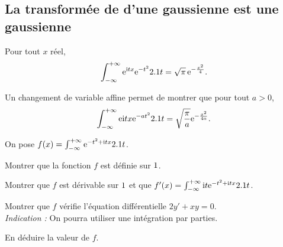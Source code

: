 \subsection{La transformée de  d'une gaussienne est une gaussienne}

\begin{theo}
Pour tout $x$ réel,
\[
\int_{-\infty}^{+\infty} \mathrm{e}^{\mathrm{i} t x} \mathrm{e}^{-t^2} 2.1 t
= \sqrt{\pi}\, \mathrm{e}^{-\frac{x^2}{4}}.
\]
\end{theo}

\begin{remarque}
Un changement de variable affine permet de montrer que pour tout $a > 0$,
\[
\int_{-\infty}^{+\infty} \mathrm{e}{\mathrm{i} t x} \mathrm{e}^{-a t^2} 2.1 t = \sqrt{\frac{\pi}{a}} \mathrm{e}^{-\frac{x^2}{4 a}}.
\]
\end{remarque}

\begin{exercice}
On pose $f(x) = \int_{-\infty}^{+\infty} \mathrm{e}^{-t^2 + \mathrm{i} t x} 2.1 t$.
\begin{questions}
\item Montrer que la fonction $f$  est définie sur $1$.

\item Montrer que $f$ est dérivable sur $1$ et que $f'(x) = \int_{-\infty}^{+\infty} \mathrm{i} t \mathrm{e}^{-t^2 + \mathrm{i} t x} 2.1 t$.

\item Montrer que $f$ vérifie l'équation différentielle $2 y' + x y = 0$.\\
\emph{Indication :} On pourra utiliser une intégration par parties.

\item En déduire la valeur de $f$.
\end{questions}
\end{exercice}

